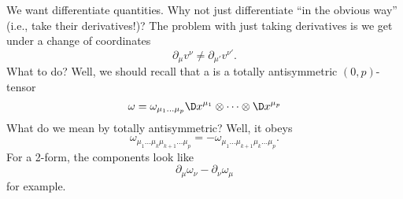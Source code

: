 
We want differentiate quantities. Why not just differentiate ``in
the obvious way'' (i.e., take their derivatives!)?
The problem with just taking derivatives is we get under a change
of coordinates
\begin{equation}
\partial_{\mu}v^{\nu}\not=\partial_{\mu'}v^{\nu'}.
\end{equation}
What to do? Well, we should recall that a 
is a totally antisymmetric $(0,p)$-tensor
\begin{equation}
\omega=\omega_{\mu_{1}\dots\mu_{p}}\D x^{\mu_{1}}\otimes\dots\otimes\D x^{\mu_{p}}
\end{equation}
What do we mean by totally antisymmetric? Well, it obeys
\begin{equation}
\omega_{\mu_{1}\dots\mu_{k}\mu_{k+1}\dots\mu_{p}}
=-\omega_{\mu_{1}\dots\mu_{k+1}\mu_{k}\dots\mu_{p}}.
\end{equation}
For a 2-form, the components look like
\begin{equation}
\partial_{\mu}\omega_{\nu}-\partial_{\nu}\omega_{\mu}
\end{equation}
for example.


